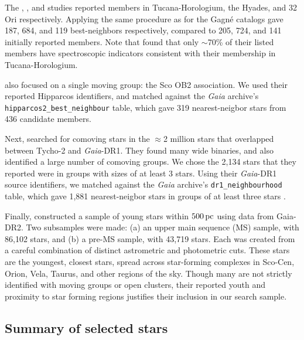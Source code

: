 \documentclass[12pt,twocolumn,tighten]{aastex62}
\begin{document}
The \citet{kraus_tucanahor_2014}, \citet{roser_deep_2011}, and
\citet{bell_32ori_2017} studies reported members in Tucana-Horologium,
the Hyades, and 32$\,$Ori respectively.  Applying the same procedure as
for the Gagn\'e catalogs gave 187, 684, and 119 best-neighbors
respectively, compared to 205, 724, and 141 initially reported
members.  Note that \citet{kraus_tucanahor_2014} found that only
$\sim$70\% of their listed members have spectroscopic indicators
consistent with their membership in Tucana-Horologium.

\citet{rizzuto_multidimensional_2011} also focused on a single moving
group: the Sco OB2 association. We used their reported Hipparcos
identifiers, and matched against the {\it Gaia} archive's
\texttt{hipparcos2\_best\_neighbour} table, which gave 319
nearest-neigbor stars from 436 candidate members.

Next, \citet{oh_comoving_2017} searched for comoving stars in the
$\approx$2 million stars that overlapped between Tycho-2 and {\it
Gaia}-DR1.  They found many wide binaries, and also identified a large
number of comoving groups.  We chose the 2{,}134 stars that they
reported were in groups with sizes of at least 3 stars.  Using their
{\it Gaia}-DR1 source identifiers, we matched against the {\it Gaia}
archive's \texttt{dr1\_neighbourhood} table, which gave 1{,}881
nearest-neigbor stars in groups of at least three stars
\citep{marrese_gaia_2019}.

Finally, \citet{zari_3d_2018} constructed a sample of young stars
within $500\,{\rm pc}$ using data from Gaia-DR2. Two subsamples were
made: (a) an upper main sequence (MS) sample, with 86{,}102 stars, and
(b) a pre-MS sample, with 43{,}719 stars.  Each was created from a
careful combination of distinct astrometric and photometric cuts.
These stars are the youngest, closest stars, spread across
star-forming complexes in Sco-Cen, Orion, Vela, Taurus, and other
regions of the sky.  Though many are not strictly identified with
moving groups or open clusters, their reported youth and proximity to star
forming regions justifies their inclusion in our search sample.




\subsection{Summary of selected stars}
\label{subsec:ocmgsummary}
\end{document}
